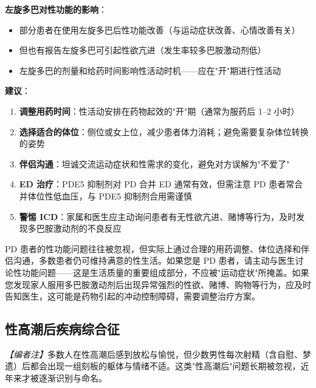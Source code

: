 \vspace{0.5em}
\noindent\textbf{左旋多巴对性功能的影响}：

\begin{itemize}[leftmargin=2cm]
	\item 部分患者在使用左旋多巴后性功能改善（与运动症状改善、心情改善有关）
	\item 但也有报告左旋多巴可引起性欲亢进（发生率较多巴胺激动剂低）
	\item 左旋多巴的剂量和给药时间影响性活动时机——应在"开"期进行性活动
\end{itemize}

\vspace{0.5em}
\noindent\textbf{建议}：

\begin{enumerate}
	\item \textbf{调整用药时间}：性活动安排在药物起效的"开"期（通常为服药后 1--2 小时）
	\item \textbf{选择适合的体位}：侧位或女上位，减少患者体力消耗；避免需要复杂体位转换的姿势
	\item \textbf{伴侣沟通}：坦诚交流运动症状和性需求的变化，避免对方误解为"不爱了"
	\item \textbf{ED 治疗}：PDE5 抑制剂对 PD 合并 ED 通常有效，但需注意 PD 患者常合并体位性低血压，与 PDE5 抑制剂合用需谨慎
	\item \textbf{警惕 ICD}：家属和医生应主动询问患者有无性欲亢进、赌博等行为，及时发现多巴胺激动剂的不良反应
\end{enumerate}

\begin{tcolorbox}[colback=pink!5!white,colframe=red!50!black,title=贴心小叮咛]
PD 患者的性功能问题往往被忽视，但实际上通过合理的用药调整、体位选择和伴侣沟通，多数患者仍可维持满意的性生活。如果您是 PD 患者，请主动与医生讨论性功能问题——这是生活质量的重要组成部分，不应被"运动症状"所掩盖。如果您发现家人服用多巴胺激动剂后出现异常强烈的性欲、赌博、购物等行为，应及时告知医生，这可能是药物引起的冲动控制障碍，需要调整治疗方案。
\end{tcolorbox}

\subsection{性高潮后疾病综合征}
\label{subsec:pois}

\noindent\textit{【编者注】}多数人在性高潮后感到放松与愉悦，但少数男性每次射精（含自慰、梦遗）后都会出现一组刻板的躯体与情绪不适。这类"性高潮后"问题长期被忽视，近年来才被逐渐识别与命名。


